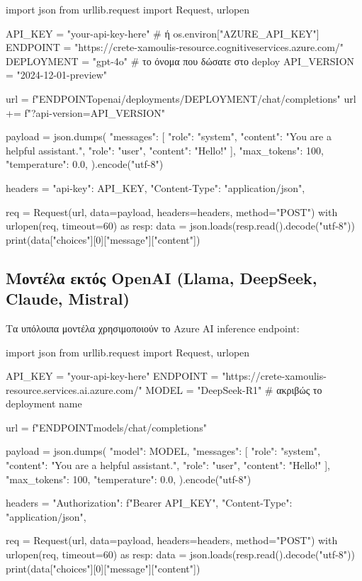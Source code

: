 \documentclass[11pt,a4paper]{article}
\begin{document}
\begin{codeblock}[title={\smallPython --- Azure OpenAI}]
import json
from urllib.request import Request, urlopen

API_KEY = "your-api-key-here"  # ή os.environ["AZURE_API_KEY"]
ENDPOINT = "https://crete-xamoulis-resource.cognitiveservices.azure.com/"
DEPLOYMENT = "gpt-4o"  # το όνομα που δώσατε στο deploy
API_VERSION = "2024-12-01-preview"

url = f"{ENDPOINT}openai/deployments/{DEPLOYMENT}/chat/completions"
url += f"?api-version={API_VERSION}"

payload = json.dumps({
    "messages": [
        {"role": "system", "content": "You are a helpful assistant."},
        {"role": "user", "content": "Hello!"}
    ],
    "max_tokens": 100,
    "temperature": 0.0,
}).encode("utf-8")

headers = {
    "api-key": API_KEY,
    "Content-Type": "application/json",
}

req = Request(url, data=payload, headers=headers, method="POST")
with urlopen(req, timeout=60) as resp:
    data = json.loads(resp.read().decode("utf-8"))
    print(data["choices"][0]["message"]["content"])
\end{codeblock}

\subsection{Μοντέλα εκτός OpenAI (Llama, DeepSeek, Claude, Mistral)}

Τα υπόλοιπα μοντέλα χρησιμοποιούν το Azure AI inference endpoint:

\begin{codeblock}[title={\smallPython --- Azure AI Inference}]
import json
from urllib.request import Request, urlopen

API_KEY = "your-api-key-here"
ENDPOINT = "https://crete-xamoulis-resource.services.ai.azure.com/"
MODEL = "DeepSeek-R1"  # ακριβώς το deployment name

url = f"{ENDPOINT}models/chat/completions"

payload = json.dumps({
    "model": MODEL,
    "messages": [
        {"role": "system", "content": "You are a helpful assistant."},
        {"role": "user", "content": "Hello!"}
    ],
    "max_tokens": 100,
    "temperature": 0.0,
}).encode("utf-8")

headers = {
    "Authorization": f"Bearer {API_KEY}",
    "Content-Type": "application/json",
}

req = Request(url, data=payload, headers=headers, method="POST")
with urlopen(req, timeout=60) as resp:
    data = json.loads(resp.read().decode("utf-8"))
    print(data["choices"][0]["message"]["content"])
\end{codeblock}
\end{document}
